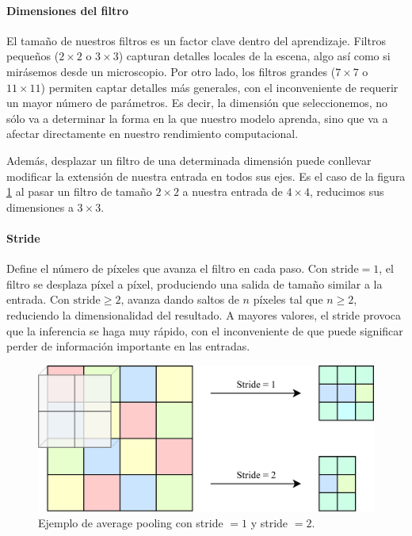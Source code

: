 \paragraph{Dimensiones del filtro}

El tamaño de nuestros filtros es un factor clave dentro del aprendizaje. Filtros pequeños ($2\times2$ o $3\times3$) capturan detalles locales de la escena, algo así como si mirásemos desde un microscopio. Por otro lado, los filtros grandes ($7\times7$ o $11\times11$) permiten captar detalles más generales, con el inconveniente de requerir un mayor número de parámetros. Es decir, la dimensión que seleccionemos, no sólo va a determinar la forma en la que nuestro modelo aprenda, sino que va a afectar directamente en nuestro rendimiento computacional.

Además, desplazar un filtro de una determinada dimensión puede conllevar modificar la extensión de nuestra entrada en todos sus ejes. Es el caso de la figura \ref{fig:stride_avg_pooling} al pasar un filtro de tamaño $2\times2$ a nuestra entrada de $4\times4$, reducimos sus dimensiones a $3\times3$.

\paragraph{Stride}

Define el número de píxeles que avanza el filtro en cada paso. Con $\text{stride}=1$, el filtro se desplaza píxel a píxel, produciendo una salida de tamaño similar a la entrada. Con $\text{stride} \ge 2$, avanza dando saltos de $n$ píxeles tal que $n \ge 2$, reduciendo la dimensionalidad del resultado. A mayores valores, el stride provoca que la inferencia se haga muy rápido, con el inconveniente de que puede significar perder de información importante en las entradas.

\begin{figure}[h]
	\centering
	\includegraphics[width=0.65\linewidth]{figures/ejemplos/stride_avg_pooling.png}
	\caption{Ejemplo de average pooling con stride $= 1$ y stride $= 2$.}
	\label{fig:stride_avg_pooling}
\end{figure}

